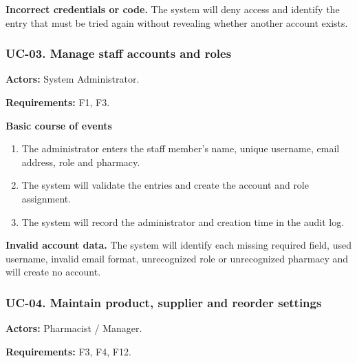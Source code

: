 \textbf{Incorrect credentials or code.} The system will deny access and identify the entry that must be tried again without revealing whether another account exists.


\clearpage
\subsubsection*{UC-03. Manage staff accounts and roles}
\textbf{Actors:} System Administrator.

\textbf{Requirements:} F1, F3.

\textbf{Basic course of events}
\begin{enumerate}
\item The administrator enters the staff member's name, unique username, email address, role and pharmacy.
\item The system will validate the entries and create the account and role assignment.
\item The system will record the administrator and creation time in the audit log.
\end{enumerate}

\textbf{Invalid account data.} The system will identify each missing required field, used username, invalid email format, unrecognized role or unrecognized pharmacy and will create no account.


\clearpage
\subsubsection*{UC-04. Maintain product, supplier and reorder settings}
\textbf{Actors:} Pharmacist / Manager.

\textbf{Requirements:} F3, F4, F12.

